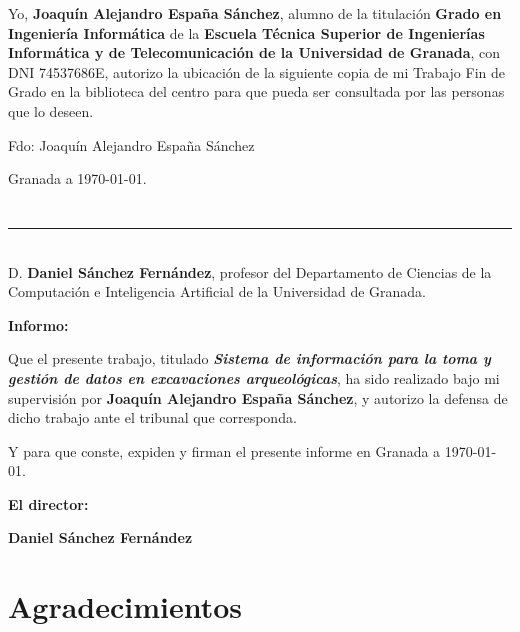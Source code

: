 Yo, \textbf{Joaquín Alejandro España Sánchez}, alumno de la titulación \textbf{Grado en
Ingeniería Informática} de la \textbf{Escuela Técnica Superior de Ingenierías Informática y de
Telecomunicación de la Universidad de Granada}, con DNI 74537686E, autorizo la ubicación de
la siguiente copia de mi Trabajo Fin de Grado en la biblioteca del centro para que pueda ser
consultada por las personas que lo deseen.

\vspace{6cm}

\noindent Fdo: Joaquín Alejandro España Sánchez

\vspace{2cm}

\begin{flushright}
Granada a \today.
\end{flushright}


\chapter*{}
\thispagestyle{empty}

\noindent\rule[-1ex]{\textwidth}{2pt}\\[4.5ex]

D. \textbf{Daniel Sánchez Fernández}, profesor del Departamento de Ciencias de la Computación
e Inteligencia Artificial de la Universidad de Granada.

\vspace{0.5cm}

\textbf{Informo:}

\vspace{0.5cm}

Que el presente trabajo, titulado \textit{\textbf{Sistema de información para la toma y
gestión de datos en excavaciones arqueológicas}}, ha sido realizado bajo mi supervisión por
\textbf{Joaquín Alejandro España Sánchez}, y autorizo la defensa de dicho trabajo ante el
tribunal que corresponda.

\vspace{0.5cm}

Y para que conste, expiden y firman el presente informe en Granada a \today.

\vspace{1cm}

\textbf{El director:}

\vspace{5cm}

\noindent \textbf{Daniel Sánchez Fernández}

\chapter*{Agradecimientos}

